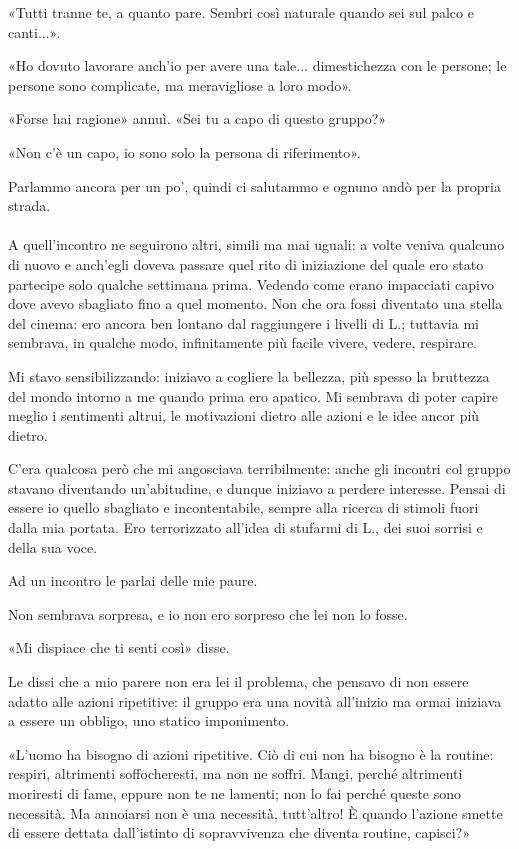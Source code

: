 \documentclass[a4paper,12pt]{book}
\begin{document}
«Tutti tranne te, a quanto pare. Sembri così naturale quando sei sul palco e
canti...».

«Ho dovuto lavorare anch'io per avere una tale... dimestichezza con le
persone; le persone sono complicate, ma meravigliose a loro modo».

«Forse hai ragione» annuì. «Sei tu a capo di questo gruppo?»

«Non c'è un capo, io sono solo la persona di riferimento».

Parlammo ancora per un po', quindi ci salutammo e ognuno andò per la propria
strada.

\paragraph{}
A quell'incontro ne seguirono altri, simili ma mai uguali: a volte veniva
qualcuno di nuovo e anch'egli doveva passare quel rito di iniziazione del
quale ero stato partecipe solo qualche settimana prima. Vedendo come erano
impacciati capivo dove avevo sbagliato fino a quel momento. Non che ora fossi
diventato una stella del cinema: ero ancora ben lontano dal raggiungere i
livelli di L.; tuttavia mi sembrava, in qualche modo, infinitamente più facile
vivere, vedere, respirare.

Mi stavo sensibilizzando: iniziavo a cogliere la bellezza, più spesso la
bruttezza del mondo intorno a me quando prima ero apatico. Mi sembrava di
poter capire meglio i sentimenti altrui, le motivazioni dietro alle azioni e le
idee ancor più dietro.

C'era qualcosa però che mi angosciava terribilmente: anche gli incontri col
gruppo stavano diventando un'abitudine, e dunque iniziavo a perdere
interesse. Pensai di essere io quello sbagliato e incontentabile, sempre alla
ricerca di stimoli fuori dalla mia portata. Ero terrorizzato all'idea di
stufarmi di L., dei suoi sorrisi e della sua voce.

Ad un incontro le parlai delle mie paure.

Non sembrava sorpresa, e io non ero sorpreso che lei non lo fosse.

«Mi dispiace che ti senti così» disse.

Le dissi che a mio parere non era lei il problema, che pensavo di non essere
adatto alle azioni ripetitive: il gruppo era una novità all'inizio ma ormai
iniziava a essere un obbligo, uno statico imponimento.

«L'uomo ha bisogno di azioni ripetitive. Ciò di cui non ha bisogno è la
routine: respiri, altrimenti soffocheresti, ma non ne soffri. Mangi, perché
altrimenti moriresti di fame, eppure non te ne lamenti; non lo fai perché
queste sono necessità. Ma annoiarsi non è una necessità, tutt'altro! È
quando l'azione smette di essere dettata dall'istinto di sopravvivenza che
diventa routine, capisci?»
\end{document}
